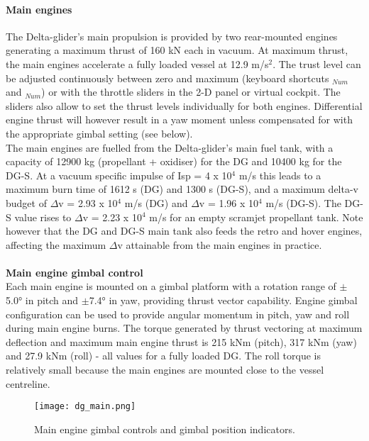 \documentclass[Orbiter User Manual.tex]{subfiles}
\begin{document}
\paragraph{Main engines}
The Delta-glider's main propulsion is provided by two rear-mounted engines generating a maximum thrust of 160 kN each in vacuum. At maximum thrust, the main engines accelerate a fully loaded vessel at 12.9 m/s$^{2}$. The trust level can be adjusted continuously between zero and maximum (keyboard shortcuts \Ctrl\keystroke{+}$_{Num}$ and \Ctrl\keystroke{-}$_{Num}$) or with the throttle sliders in the 2-D panel or virtual cockpit. The sliders also allow to set the thrust levels individually for both engines. Differential engine thrust will however result in a yaw moment unless compensated for with the appropriate gimbal setting (see below).\\
The main engines are fuelled from the Delta-glider's main fuel tank, with a capacity of 12900 kg (propellant + oxidiser) for the DG and 10400 kg for the DG-S. At a vacuum specific impulse of Isp = 4 x 10$^{4}$ m/s this leads to a maximum burn time of 1612 s (DG) and 1300 s (DG-S), and a maximum delta-v budget of $\Delta$v = 2.93 x 10$^{4}$ m/s (DG) and $\Delta$v = 1.96 x 10$^{4}$ m/s (DG-S). The DG-S value rises to $\Delta$v = 2.23 x 10$^{4}$ m/s for an empty scramjet propellant tank. Note however that the DG and DG-S main tank also feeds the retro and hover engines, affecting the maximum $\Delta$v attainable from the main engines in practice.\\
\\
\textbf{Main engine gimbal control}\\
Each main engine is mounted on a gimbal platform with a rotation range of $\pm$5.0° in pitch and $\pm$7.4° in yaw, providing thrust vector capability. Engine gimbal configuration can be used to provide angular momentum in pitch, yaw and roll during main engine burns. The torque generated by thrust vectoring at maximum deflection and maximum main engine thrust is 215 kNm (pitch), 317 kNm (yaw) and 27.9 kNm (roll) - all values for a fully loaded DG. The roll torque is relatively small because the main engines are mounted close to the vessel centreline.

\begin{figure}[H]
  \centering
  \texttt{[image: dg\_main.png]}
  \caption{Main engine gimbal controls and gimbal position indicators.}
\end{figure}
\end{document}
